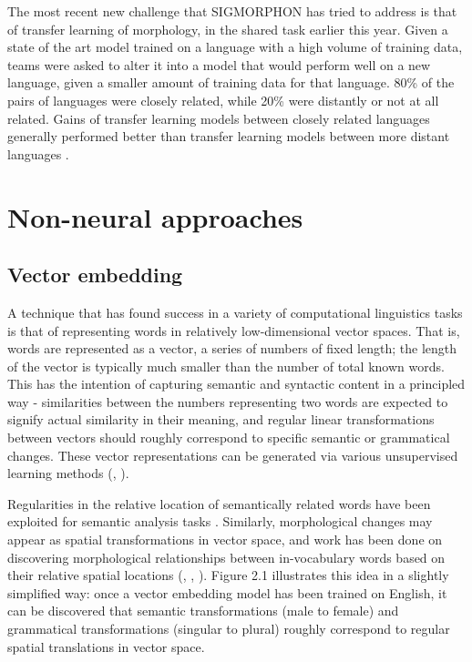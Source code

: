 The most recent new challenge that SIGMORPHON has tried to address is that of transfer learning of morphology, in the shared task earlier this year. Given a state of the art model trained on a language with a high volume of training data, teams were asked to alter it into a model that would perform well on a new language, given a smaller amount of training data for that language. 80\% of the pairs of languages were closely related, while 20\% were distantly or not at all related. Gains of transfer learning models between closely related languages generally performed better than transfer learning models between more distant languages \parencite{McCarthy2019}.

\section{Non-neural approaches}

\subsection{Vector embedding}

A technique that has found success in a variety of computational linguistics tasks is that of representing words in relatively low-dimensional vector spaces. That is, words are represented as a vector, a series of numbers of fixed length; the length of the vector is typically much smaller than the number of total known words. This has the intention of capturing semantic and syntactic content in a principled way - similarities between the numbers representing two words are expected to signify actual similarity in their meaning, and regular linear transformations between vectors should roughly correspond to specific semantic or grammatical changes. These vector representations can be generated via various unsupervised learning methods (\cite{Bilmes2003}, \cite{Alexandrescu2006}).

Regularities in the relative location of semantically related words have been exploited for semantic analysis tasks \parencite{Alexandrescu2006}. Similarly, morphological changes may appear as spatial transformations in vector space, and work has been done on discovering morphological relationships between in-vocabulary words based on their relative spatial locations (\cite{Mikolov2013}, \cite{Soricut2015}, \cite{DosSantos2014}). Figure 2.1 illustrates this idea in a slightly simplified way: once a vector embedding model has been trained on English, it can be discovered that semantic transformations (male to female) and grammatical transformations (singular to plural) roughly correspond to regular spatial translations in vector space.


